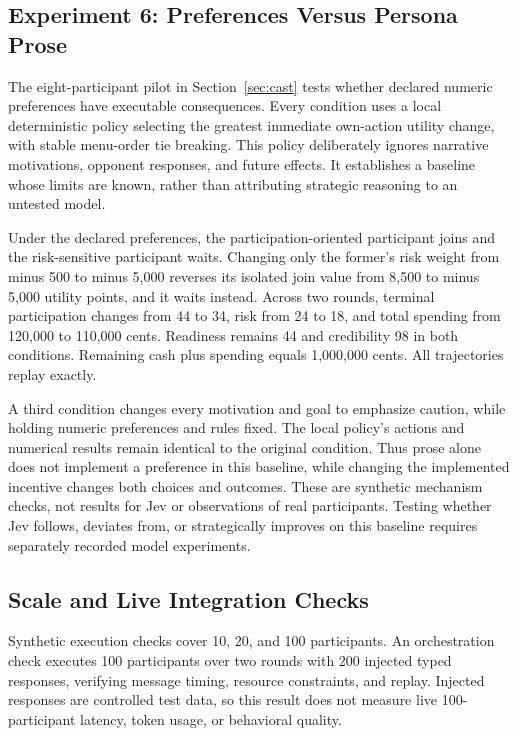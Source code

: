 \subsection{Experiment 6: Preferences Versus Persona Prose}
The eight-participant pilot in Section~\ref{sec:cast} tests whether declared
numeric preferences have executable consequences. Every condition uses a
local deterministic policy selecting the greatest immediate own-action utility
change, with stable menu-order tie breaking. This policy deliberately ignores
narrative motivations, opponent responses, and future effects. It establishes
a baseline whose limits are known, rather than attributing strategic reasoning
to an untested model.

Under the declared preferences, the participation-oriented participant joins
and the risk-sensitive participant waits. Changing only the former's risk
weight from minus 500 to minus 5,000 reverses its isolated join value from
8,500 to minus 5,000 utility points, and it waits instead. Across two rounds,
terminal participation changes from 44 to 34, risk from 24 to 18, and total
spending from 120,000 to 110,000 cents. Readiness remains 44 and credibility
98 in both conditions. Remaining cash plus spending equals 1,000,000 cents.
All trajectories replay exactly.

A third condition changes every motivation and goal to emphasize caution,
while holding numeric preferences and rules fixed. The local policy's actions
and numerical results remain identical to the original condition. Thus prose
alone does not implement a preference in this baseline, while changing the
implemented incentive changes both choices and outcomes. These are synthetic
mechanism checks, not results for Jev or observations of real participants.
Testing whether Jev follows, deviates from, or strategically improves on this
baseline requires separately recorded model experiments.

\subsection{Scale and Live Integration Checks}
Synthetic execution checks cover 10, 20, and 100 participants. An orchestration
check executes 100 participants over two rounds with 200 injected typed
responses, verifying message timing, resource constraints, and replay. Injected
responses are controlled test data, so this result does not measure live
100-participant latency, token usage, or behavioral quality.

